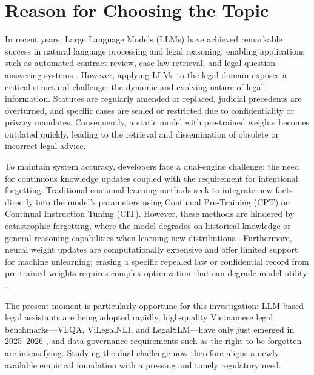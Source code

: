 \section{Reason for Choosing the Topic}

In recent years, Large Language Models (LLMs) have achieved remarkable success in natural language processing and legal reasoning, enabling applications such as automated contract review, case law retrieval, and legal question-answering systems \parencite{le-etal-2025-overview, nguyen2025vlqacomprehensivelargehighquality}. However, applying LLMs to the legal domain exposes a critical structural challenge: the dynamic and evolving nature of legal information. Statutes are regularly amended or replaced, judicial precedents are overturned, and specific cases are sealed or restricted due to confidentiality or privacy mandates. Consequently, a static model with pre-trained weights becomes outdated quickly, leading to the retrieval and dissemination of obsolete or incorrect legal advice.

To maintain system accuracy, developers face a dual-engine challenge: the need for continuous knowledge updates coupled with the requirement for intentional forgetting. Traditional continual learning methods seek to integrate new facts directly into the model's parameters using Continual Pre-Training (CPT) or Continual Instruction Tuning (CIT). However, these methods are hindered by catastrophic forgetting, where the model degrades on historical knowledge or general reasoning capabilities when learning new distributions \parencite{kalajdzievski2024scalinglawsforgettingfinetuning, li2024revisitingcatastrophicforgettinglarge}. Furthermore, neural weight updates are computationally expensive and offer limited support for machine unlearning; erasing a specific repealed law or confidential record from pre-trained weights requires complex optimization that can degrade model utility \parencite{11207222}.

The present moment is particularly opportune for this investigation: LLM-based legal assistants are being adopted rapidly, high-quality Vietnamese legal benchmarks---VLQA, ViLegalNLI, and LegalSLM---have only just emerged in 2025--2026 \parencite{nguyen2025vlqacomprehensivelargehighquality, duong2026vilegalnlinaturallanguageinference, le-etal-2025-overview}, and data-governance requirements such as the right to be forgotten are intensifying. Studying the dual challenge now therefore aligns a newly available empirical foundation with a pressing and timely regulatory need.

